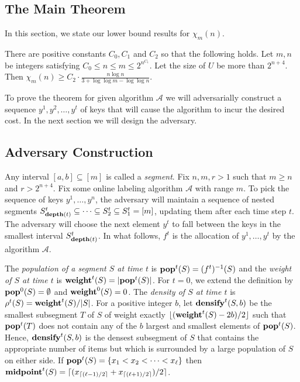 \documentclass[runningheads,a4paper]{llncs}
\newcommand{\A}{\mathcal{A}}
\newcommand{\thmA}{{C_0}}
\newcommand{\thmB}{{C_1}}
\newcommand{\thmC}{{C_2}}
\newcommand{\pop}{{\rm {\bf pop}}}
\newcommand{\weight}{{\rm {\bf weight}}}
\newcommand{\midp}{{\rm {\bf midpoint}}}
\newcommand{\depth}{{\rm {\bf depth}}}
\newcommand{\densify}{{\rm {\bf densify}}}
\begin{document}
\subsection{The Main Theorem}
\label{subsec:main theorem}
In this section, we state our lower bound results for  $\chi_m(n)$.   

\begin{theorem}
\label{thm:main}
There are positive constants $\thmA, \thmB$ and $\thmC$ so that the following holds. Let $m,n$ be integers satisfying
$\thmA \leq n \le m \le 2^{n^\thmB}$. Let the size of $U$ be more than $2^{n+4}$. 
Then $\chi_m(n) \geq \thmC \cdot \frac{n \log n}{3 + \log \log m - \log \log n}$.
\end{theorem}


To prove the theorem for given algorithm $\A$ we will adversarially construct a sequence $y^1,y^2,\dots,y^t$ of keys that will cause
the algorithm to incur the desired cost. In the next section we will design the adversary.

\subsection{Adversary Construction}

Any interval $[a,b]\subseteq [m]$ is called a \emph{segment}. Fix $n,m,r>1$ such that $m\ge n$ and $r>2^{n+4}$.
Fix some online labeling algorithm $\A$ with range $m$. 
To pick the sequence of keys $y^1,\dots,y^n$, the adversary will maintain a sequence of 
nested segments $S^t_{\depth(t)} \subseteq \cdots \subseteq S^t_2 \subseteq S^t_1 = [m]$, updating them after each time step $t$. 
The adversary will choose the next element $y^{t}$ to fall between the keys in
the smallest interval $S^t_{\depth(t)}$. In what follows, $f^t$ is the allocation of $y^1,\dots,y^t$ by the algorithm $\A$.

The \emph{population of a segment $S$ at time $t$} is $\pop^t(S) = (f^t)^{-1}(S)$ and the 
\emph{weight of $S$ at time $t$} is $\weight^t(S) = |\pop^t(S)|$. 
For $t=0$, we extend the definition by $\pop^0(S) = \emptyset$ and $\weight^0(S) = 0$.  
The \emph{density of $S$ at time $t$} is $\rho^t(S) = \weight^t(S) / |S|$. For a positive 
integer $b$, let $\densify^t(S,b)$ be the smallest subsegment $T$ of $S$ of weight exactly 
$\lfloor (\weight^t(S) - 2b) / 2 \rfloor$ such that $\pop^t(T)$ does not contain any of the $b$ largest 
and smallest elements of $\pop^t(S)$. Hence, $\densify^t(S,b)$ is the densest subsegment of $S$ that contains 
the appropriate number of items but which is surrounded by a large population of $S$ on either side.
If $\pop^t(S)=\{x_1<x_2 <\cdots <x_\ell\}$ then $\midp^t(S)= \lceil (x_{\lceil (\ell-1)/2 \rceil} + x_{\lceil (\ell+1)/2 \rceil} )/ 2 \rceil$.
\end{document}
